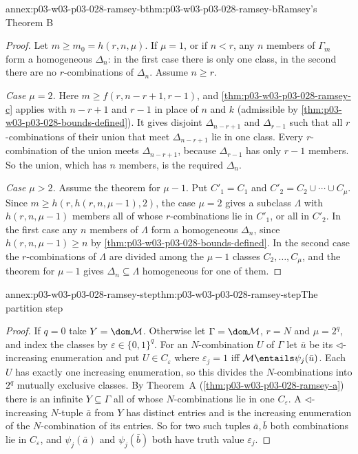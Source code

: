 \begin{annexitem}{annex:p03-w03-p03-028-ramsey-b}{thm:p03-w03-p03-028-ramsey-b}{Ramsey's Theorem B}
\begin{proof}
Let \(m\geq m_0=h(r,n,\mu)\).  If \(\mu=1\), or if \(n<r\), any \(n\)
members of \(\Gamma_m\) form a homogeneous \(\Delta_n\): in the first case
there is only one class, in the second there are no \(r\)-combinations of
\(\Delta_n\).  Assume \(n\geq r\).

\emph{Case \(\mu=2\).}  Here \(m\geq f(r,n-r+1,r-1)\), and
\cref{thm:p03-w03-p03-028-ramsey-c} applies with \(n-r+1\) and \(r-1\) in
place of \(n\) and \(k\) (admissible by
\cref{thm:p03-w03-p03-028-bounds-defined}).  It gives disjoint
\(\Delta_{n-r+1}\) and \(\Delta_{r-1}\) such that all \(r\)-combinations of
their union that meet \(\Delta_{n-r+1}\) lie in one class.  Every
\(r\)-combination of the union meets \(\Delta_{n-r+1}\), because
\(\Delta_{r-1}\) has only \(r-1\) members.  So the union, which has \(n\)
members, is the required \(\Delta_n\).

\emph{Case \(\mu>2\).}  Assume the theorem for \(\mu-1\).  Put
\(C'_1=C_1\) and \(C'_2=C_2\cup\cdots\cup C_\mu\).  Since
\(m\geq h(r,h(r,n,\mu-1),2)\), the case \(\mu=2\) gives a subclass
\(\Lambda\) with \(h(r,n,\mu-1)\) members all of whose
\(r\)-combinations lie in \(C'_1\), or all in \(C'_2\).  In the first case
any \(n\) members of \(\Lambda\) form a homogeneous \(\Delta_n\), since
\(h(r,n,\mu-1)\geq n\) by \cref{thm:p03-w03-p03-028-bounds-defined}.  In
the second case the \(r\)-combinations of \(\Lambda\) are divided among the
\(\mu-1\) classes \(C_2,\ldots,C_\mu\), and the theorem for \(\mu-1\)
gives \(\Delta_n\subseteq\Lambda\) homogeneous for one of them.
\end{proof}
\end{annexitem}

\begin{annexitem}{annex:p03-w03-p03-028-ramsey-step}{thm:p03-w03-p03-028-ramsey-step}{The partition step}
\begin{proof}
If \(q=0\) take \(Y=\dom\mathcal M\).  Otherwise let
\(\Gamma=\dom\mathcal M\), \(r=N\) and \(\mu=2^q\), and index the classes
by \(\varepsilon\in\{0,1\}^q\).  For an \(N\)-combination \(U\) of
\(\Gamma\) let \(\bar u\) be its \(\lhd\)-increasing enumeration and put
\(U\in C_\varepsilon\) where \(\varepsilon_j=1\) iff
\(\mathcal M\entails\psi_j(\bar u)\).  Each \(U\) has exactly one
increasing enumeration, so this divides the \(N\)-combinations into
\(2^q\) mutually exclusive classes.  By Theorem~A
(\cref{thm:p03-w03-p03-028-ramsey-a}) there is an infinite \(Y\subseteq
\Gamma\) all of whose \(N\)-combinations lie in one \(C_\varepsilon\).  A
\(\lhd\)-increasing \(N\)-tuple \(\bar a\) from \(Y\) has distinct entries
and is the increasing enumeration of the \(N\)-combination of its entries.
So for two such tuples \(\bar a,\bar b\) both combinations lie in
\(C_\varepsilon\), and \(\psi_j(\bar a)\) and \(\psi_j(\bar b)\) both have
truth value \(\varepsilon_j\).
\end{proof}
\end{annexitem}

